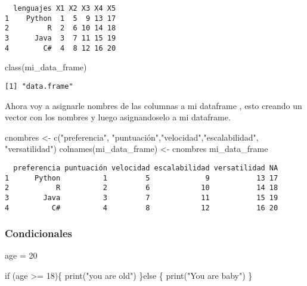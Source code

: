 \documentclass[
  letterpaper,
  DIV=11,
  numbers=noendperiod]{scrartcl}
\newenvironment{Shaded}{\begin{snugshade}}{\end{snugshade}}
\newcommand{\ControlFlowTok}[1]{\textcolor[rgb]{0.00,0.23,0.31}{#1}}
\newcommand{\DecValTok}[1]{\textcolor[rgb]{0.68,0.00,0.00}{#1}}
\newcommand{\FunctionTok}[1]{\textcolor[rgb]{0.28,0.35,0.67}{#1}}
\newcommand{\NormalTok}[1]{\textcolor[rgb]{0.00,0.23,0.31}{#1}}
\newcommand{\OtherTok}[1]{\textcolor[rgb]{0.00,0.23,0.31}{#1}}
\newcommand{\SpecialCharTok}[1]{\textcolor[rgb]{0.37,0.37,0.37}{#1}}
\newcommand{\StringTok}[1]{\textcolor[rgb]{0.13,0.47,0.30}{#1}}
\begin{document}
\begin{verbatim}
  lenguajes X1 X2 X3 X4 X5
1    Python  1  5  9 13 17
2         R  2  6 10 14 18
3      Java  3  7 11 15 19
4        C#  4  8 12 16 20
\end{verbatim}

\begin{Shaded}
\begin{Highlighting}[]
\FunctionTok{class}\NormalTok{(mi\_data\_frame)}
\end{Highlighting}
\end{Shaded}

\begin{verbatim}
[1] "data.frame"
\end{verbatim}

Ahora voy a asignarle nombres de las columnas a mi dataframe , esto
creando un vector con los nombres y luego asignandoselo a mi dataframe.

\begin{Shaded}
\begin{Highlighting}[]
\NormalTok{cnombres }\OtherTok{\textless{}{-}} \FunctionTok{c}\NormalTok{(}\StringTok{"preferencia"}\NormalTok{, }\StringTok{"puntuación"}\NormalTok{,}\StringTok{"velocidad"}\NormalTok{,}\StringTok{"escalabilidad"}\NormalTok{, }\StringTok{"versatilidad"}\NormalTok{)}
\FunctionTok{colnames}\NormalTok{(mi\_data\_frame) }\OtherTok{\textless{}{-}}\NormalTok{ cnombres}
\NormalTok{mi\_data\_frame}
\end{Highlighting}
\end{Shaded}

\begin{verbatim}
  preferencia puntuación velocidad escalabilidad versatilidad NA
1      Python          1         5             9           13 17
2           R          2         6            10           14 18
3        Java          3         7            11           15 19
4          C#          4         8            12           16 20
\end{verbatim}

\subsubsection{Condicionales}\label{condicionales}

\begin{Shaded}
\begin{Highlighting}[]
\NormalTok{age }\OtherTok{=} \DecValTok{20}

\ControlFlowTok{if}\NormalTok{ (age }\SpecialCharTok{\textgreater{}=} \DecValTok{18}\NormalTok{)\{}
  \FunctionTok{print}\NormalTok{(}\StringTok{"you are old"}\NormalTok{)}
\NormalTok{\}}\ControlFlowTok{else}\NormalTok{ \{}
  \FunctionTok{print}\NormalTok{(}\StringTok{"You are baby"}\NormalTok{)}
\NormalTok{\}}
\end{Highlighting}
\end{Shaded}
\end{document}
